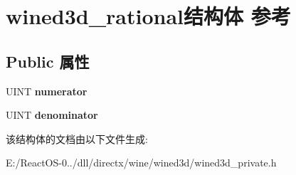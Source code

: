 \hypertarget{structwined3d__rational}{}\section{wined3d\+\_\+rational结构体 参考}
\label{structwined3d__rational}
\subsection*{Public 属性}
\begin{DoxyCompactItemize}
\item 
\mbox{\label{structwined3d__rational_ac2059087e8c8d7c168ac25f1cf075788}} 
U\+I\+NT {\bfseries numerator}
\item 
\mbox{\label{structwined3d__rational_a37ba7711d74cac7ba881380802b9941e}} 
U\+I\+NT {\bfseries denominator}
\end{DoxyCompactItemize}


该结构体的文档由以下文件生成\+:\begin{DoxyCompactItemize}
\item 
E\+:/\+React\+O\+S-\/0../dll/directx/wine/wined3d/wined3d\+\_\+private.\+h\end{DoxyCompactItemize}
